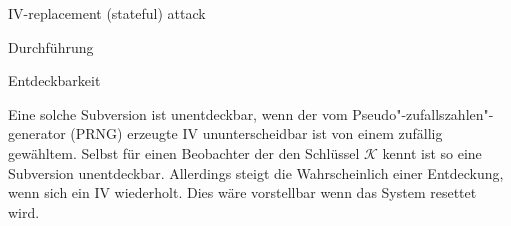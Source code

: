 \begin{section}{IV-replacement (stateful) attack}
\begin{subsection}{Durchführung}
\end{subsection}

\begin{subsection}{Entdeckbarkeit}

Eine solche Subversion ist unentdeckbar, wenn der vom Pseudo"-zufallszahlen"-generator (PRNG) erzeugte IV ununterscheidbar ist von einem zufällig gewähltem. Selbst für einen Beobachter der den Schlüssel $\mathcal{K}$ kennt ist so eine Subversion unentdeckbar. Allerdings steigt die Wahrscheinlich einer Entdeckung, wenn sich ein IV wiederholt. Dies wäre vorstellbar wenn das System resettet wird.

\end{subsection}

\end{section}